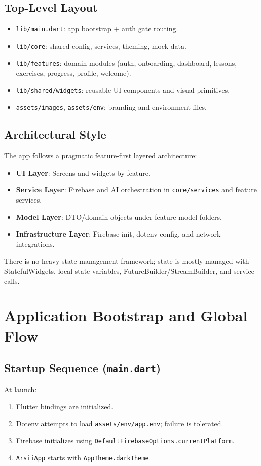 \documentclass[11pt,a4paper]{article}
\begin{document}
\subsection{Top-Level Layout}
\begin{itemize}
  \item \texttt{lib/main.dart}: app bootstrap + auth gate routing.
  \item \texttt{lib/core}: shared config, services, theming, mock data.
  \item \texttt{lib/features}: domain modules (auth, onboarding, dashboard, lessons, exercises, progress, profile, welcome).
  \item \texttt{lib/shared/widgets}: reusable UI components and visual primitives.
  \item \texttt{assets/images}, \texttt{assets/env}: branding and environment files.
\end{itemize}

\subsection{Architectural Style}
The app follows a pragmatic feature-first layered architecture:
\begin{itemize}
  \item \textbf{UI Layer}: Screens and widgets by feature.
  \item \textbf{Service Layer}: Firebase and AI orchestration in \texttt{core/services} and feature services.
  \item \textbf{Model Layer}: DTO/domain objects under feature model folders.
  \item \textbf{Infrastructure Layer}: Firebase init, dotenv config, and network integrations.
\end{itemize}

There is no heavy state management framework; state is mostly managed with StatefulWidgets, local state variables, FutureBuilder/StreamBuilder, and service calls.

\section{Application Bootstrap and Global Flow}
\subsection{Startup Sequence (\texttt{main.dart})}
At launch:
\begin{enumerate}
  \item Flutter bindings are initialized.
  \item Dotenv attempts to load \texttt{assets/env/app.env}; failure is tolerated.
  \item Firebase initializes using \texttt{DefaultFirebaseOptions.currentPlatform}.
  \item \texttt{ArsiiApp} starts with \texttt{AppTheme.darkTheme}.
\end{enumerate}
\end{document}
